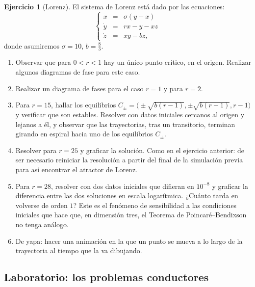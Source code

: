 \documentclass[12pt, a4paper]{amsbook}
\theoremstyle{remark}
\theoremstyle{definition}
\newtheorem{ejer}[teo]{Ejercicio}
\numberwithin{section}{chapter}
\numberwithin{subsection}{section}
\numberwithin{equation}{section}
\numberwithin{figure}{chapter}
\begin{document}
\begin{ejer}[Lorenz]
El sistema de Lorenz está dado por las ecuaciones:
\[\left\{\begin{array}{rcl}
    \dot{x} &=& \sigma(y-x) \\
    \dot{y} &=& rx-y-xz \\
    \dot{z} &=& xy-bz,
    \end{array}\right.\]
donde asumiremos $\sigma=10$, $b=\frac{8}{3}$. 
\begin{enumerate}
    \item Observar que para $0<r<1$ hay un único punto crítico, en el origen. Realizar algunos diagramas de fase para este caso. 
    \item Realizar un diagrama de fases para el caso $r=1$ y para $r=2$.
    \item Para $r=15$, hallar los equilibrios $C_\pm=\bigl(\pm\sqrt{b(r-1)},\pm\sqrt{b(r-1)},r-1\bigr)$ y verificar que son estables. Resolver con datos iniciales cercanos al origen y lejanos a él, y observar que las trayectorias, tras un transitorio, terminan girando en espiral hacia uno de los equilibrios $C_\pm$.
    \item Resolver para $r=25$ y graficar la solución. Como en el ejercicio anterior: de ser necesario reiniciar la resolución a partir del final de la simulación previa para así encontrar el atractor de Lorenz.
    \item Para $r=28$, resolver con dos datos iniciales que difieran en $10^{-8}$ y graficar la diferencia entre las dos soluciones en escala logarítmica. ¿Cuánto tarda en volverse de orden $1$? Este es el fenómeno de sensibilidad a las condiciones iniciales que hace que, en dimensión tres, el Teorema de Poincaré--Bendixson no tenga análogo.
    \item De yapa: hacer una animación en la que un punto se mueva a lo largo de la trayectoria al tiempo que la va dibujando. 
\end{enumerate}
\end{ejer}

\subsection*{Laboratorio: los problemas conductores}
\end{document}
